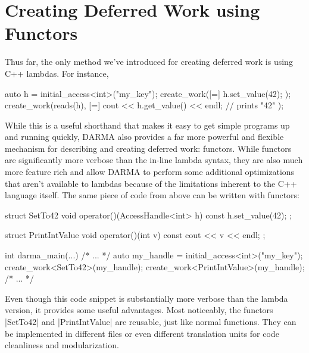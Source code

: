 
\section{Creating Deferred Work using Functors}
\label{sec:functor}

\lstMakeShortInline[style=CppCodeInlineStyle]{\|}

Thus far, the only method we've introduced for creating deferred work is using
C++ lambdas.  For instance,
\begin{CppCodeNumb}
auto h = initial_access<int>("my_key");
create_work([=]{ h.set_value(42); });
create_work(reads(h), [=]{ 
  cout << h.get_value() << endl; // prints "42"
});
\end{CppCodeNumb}
While this is a useful shorthand that makes it easy to get simple programs up
and running quickly, DARMA also provides a far more powerful and flexible
mechanism for describing and creating deferred work:  functors.  While functors
are significantly more verbose than the in-line lambda syntax, they are also
much more feature rich and allow DARMA to perform some additional optimizations
that aren't available to lambdas because of the limitations inherent to the C++
language itself.  The same piece of code from above can be written with
functors:
\begin{CppCodeNumb}
struct SetTo42 {
  void operator()(AccessHandle<int> h) const {
    h.set_value(42);
  }
};

struct PrintIntValue {
  void operator()(int v) const {
    cout << v << endl;
  }
};

int darma_main(...) {
  /* ... */
  auto my_handle = initial_access<int>("my_key");
  create_work<SetTo42>(my_handle);
  create_work<PrintIntValue>(my_handle);
  /* ... */
}
\end{CppCodeNumb}
Even though this code snippet is substantially more verbose than the lambda
version, it provides some useful advantages.  Most noticeably, the functors
|SetTo42| and |PrintIntValue| are reusable, just like normal functions.  They
can be implemented in different files or even different translation units for
code cleanliness and modularization.  

